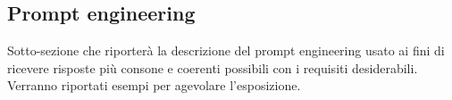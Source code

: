 \subsection{Prompt engineering}

Sotto-sezione che riporterà la descrizione del prompt engineering usato ai fini di ricevere risposte più consone e coerenti possibili con i requisiti desiderabili.
Verranno riportati esempi per agevolare l'esposizione.
